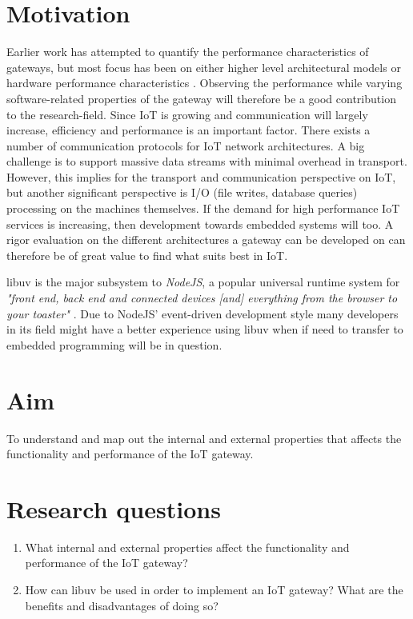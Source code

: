 \section{Motivation}
\label{sec:motivation}

Earlier work has attempted to quantify the performance characteristics of
gateways, but most focus has been on either higher level architectural models
\cite{chen2011brief} \cite{zachariah2015internet} or hardware performance
characteristics \cite{kruger2014benchmarking}. Observing the performance while
varying software-related properties of the gateway will therefore be a good
contribution to the research-field. Since IoT is growing and communication will
largely increase, efficiency and performance is an important factor. There
exists a number of communication protocols for IoT network architectures. A big
challenge is to support massive data streams with minimal overhead in
transport. However, this implies for the transport and communication
perspective on IoT, but another significant perspective is I/O (file writes,
database queries) processing on the machines themselves. If the demand for high
performance IoT services is increasing, then development towards embedded
systems will too. A rigor evaluation on the different architectures a gateway
can be developed on can therefore be of great value to find what suits best in
IoT.

libuv is the major subsystem to \textit{NodeJS}, a popular universal runtime
system for \textit{"front end, back end and connected devices [and] everything
from the browser to your toaster"} \cite{node-js-survey-report-2016}. Due to
NodeJS' event-driven development style many developers in its field might have
a better experience using libuv when if need to transfer to embedded
programming will be in question.

\section{Aim}
\label{sec:aim}

To understand and map out the internal and external properties that affects the
functionality and performance of the IoT gateway.

\section{Research questions}
\label{sec:research-questions}

\begin{enumerate}

    \item What internal and external properties affect the functionality and
        performance of the IoT gateway?

    \item How can libuv be used in order to implement an IoT gateway? What are
        the benefits and disadvantages of doing so?

\end{enumerate}

